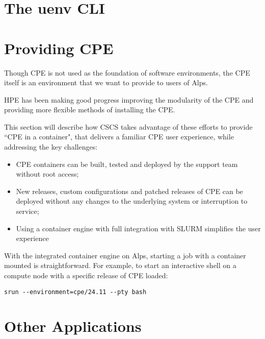 \section{The uenv CLI}

\section{Providing CPE}
\label{sec:cpe}

Though CPE is not used as the foundation of software environments, the CPE itself is an environment that we want to provide to users of Alps.

HPE has been making good progress improving the modularity of the CPE and providing more flexible methods of installing the CPE.

This section will describe how CSCS takes advantage of these efforts to provide ``CPE in a container", that delivers a familiar CPE user experience, while addressing the key challenges:

\begin{itemize}
\item CPE containers can be built, tested and deployed by the support team without root access;
\item New releases, custom configurations and patched releases of CPE can be deployed without any changes to the underlying system or interruption to service;
\item Using a container engine with full integration with SLURM simplifies the user experience
\end{itemize}

With the integrated container engine on Alps, starting a job with a container mounted is straightforward.
For example, to start an interactive shell on a compute node with a specific release of CPE loaded:
\begin{lstlisting}
srun --environment=cpe/24.11 --pty bash
\end{lstlisting}

\section{Other Applications}


